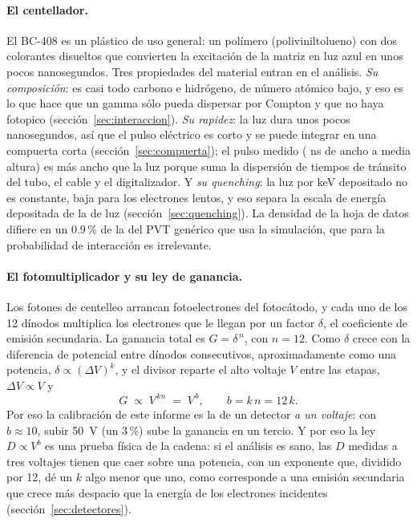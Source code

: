 \documentclass[11pt,a4paper]{article}
\begin{document}
\paragraph{El centellador.} El BC-408 es un plástico de uso general: un
polímero (poliviniltolueno) con dos colorantes disueltos que convierten la
excitación de la matriz en luz azul en unos pocos nanosegundos. Tres
propiedades del material entran en el análisis. \emph{Su composición}: es
casi todo carbono e hidrógeno, de número atómico bajo, y eso es lo que hace
que un gamma sólo pueda dispersar por Compton y que no haya fotopico
(sección~\ref{sec:interaccion}). \emph{Su rapidez}: la luz dura unos pocos
nanosegundos, así que el pulso eléctrico es corto y se puede integrar en una
compuerta corta (sección~\ref{sec:compuerta}); el pulso medido
(\EjFwhmPulso{} ns de ancho a media altura) es más ancho que la luz porque
suma la dispersión de tiempos de tránsito del tubo, el cable y el
digitalizador. Y \emph{su quenching}: la luz por keV depositado no es
constante, baja para los electrones lentos, y eso separa la escala de energía
depositada de la de luz (sección~\ref{sec:quenching}). La densidad de la hoja
de datos difiere en un 0.9\,\% de la del PVT genérico que usa la
simulación, que para la probabilidad de interacción es irrelevante.

\paragraph{El fotomultiplicador y su ley de ganancia.} Los fotones de
centelleo arrancan fotoelectrones del fotocátodo, y cada uno de los 12
dínodos multiplica los electrones que le llegan por un factor $\delta$, el
coeficiente de emisión secundaria. La ganancia total es
$G = \delta^{\,n}$, con $n = 12$. Como $\delta$ crece con la diferencia de
potencial entre dínodos consecutivos, aproximadamente como una potencia,
$\delta \propto (\Delta V)^{k}$, y el divisor reparte el alto voltaje $V$
entre las etapas, $\Delta V \propto V$ y
\[
   G \;\propto\; V^{\,k n} \;=\; V^{\,b}, \qquad b = k\,n = 12\,k .
\]
Por eso la calibración de este informe es la de un detector \emph{a un
voltaje}: con $b \approx 10$, subir 50~V (un 3\,\%) sube la ganancia en un
tercio. Y por eso la ley $D \propto V^{b}$ es una prueba física de la cadena:
si el análisis es sano, las $D$ medidas a tres voltajes tienen que caer sobre
una potencia, con un exponente que, dividido por 12, dé un $k$ algo menor que
uno, como corresponde a una emisión secundaria que crece más despacio que la
energía de los electrones incidentes (sección~\ref{sec:detectores}).
\end{document}
